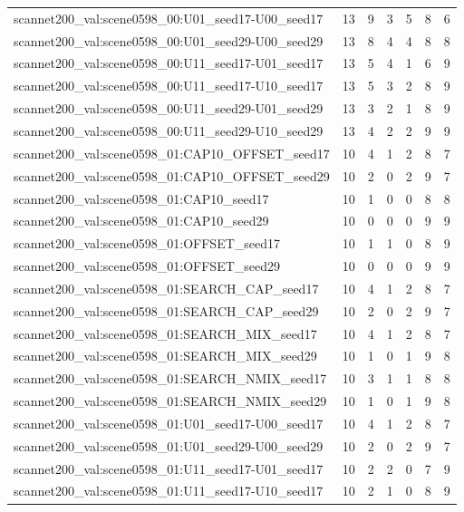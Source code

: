 \begin{table}[t]
\begin{tabular}{lrrrrrr}
scannet200\_val:scene0598\_00:U01\_seed17-U00\_seed17 & 13 & 9 & 3 & 5 & 8 & 6 \\
scannet200\_val:scene0598\_00:U01\_seed29-U00\_seed29 & 13 & 8 & 4 & 4 & 8 & 8 \\
scannet200\_val:scene0598\_00:U11\_seed17-U01\_seed17 & 13 & 5 & 4 & 1 & 6 & 9 \\
scannet200\_val:scene0598\_00:U11\_seed17-U10\_seed17 & 13 & 5 & 3 & 2 & 8 & 9 \\
scannet200\_val:scene0598\_00:U11\_seed29-U01\_seed29 & 13 & 3 & 2 & 1 & 8 & 9 \\
scannet200\_val:scene0598\_00:U11\_seed29-U10\_seed29 & 13 & 4 & 2 & 2 & 9 & 9 \\
scannet200\_val:scene0598\_01:CAP10\_OFFSET\_seed17 & 10 & 4 & 1 & 2 & 8 & 7 \\
scannet200\_val:scene0598\_01:CAP10\_OFFSET\_seed29 & 10 & 2 & 0 & 2 & 9 & 7 \\
scannet200\_val:scene0598\_01:CAP10\_seed17 & 10 & 1 & 0 & 0 & 8 & 8 \\
scannet200\_val:scene0598\_01:CAP10\_seed29 & 10 & 0 & 0 & 0 & 9 & 9 \\
scannet200\_val:scene0598\_01:OFFSET\_seed17 & 10 & 1 & 1 & 0 & 8 & 9 \\
scannet200\_val:scene0598\_01:OFFSET\_seed29 & 10 & 0 & 0 & 0 & 9 & 9 \\
scannet200\_val:scene0598\_01:SEARCH\_CAP\_seed17 & 10 & 4 & 1 & 2 & 8 & 7 \\
scannet200\_val:scene0598\_01:SEARCH\_CAP\_seed29 & 10 & 2 & 0 & 2 & 9 & 7 \\
scannet200\_val:scene0598\_01:SEARCH\_MIX\_seed17 & 10 & 4 & 1 & 2 & 8 & 7 \\
scannet200\_val:scene0598\_01:SEARCH\_MIX\_seed29 & 10 & 1 & 0 & 1 & 9 & 8 \\
scannet200\_val:scene0598\_01:SEARCH\_NMIX\_seed17 & 10 & 3 & 1 & 1 & 8 & 8 \\
scannet200\_val:scene0598\_01:SEARCH\_NMIX\_seed29 & 10 & 1 & 0 & 1 & 9 & 8 \\
scannet200\_val:scene0598\_01:U01\_seed17-U00\_seed17 & 10 & 4 & 1 & 2 & 8 & 7 \\
scannet200\_val:scene0598\_01:U01\_seed29-U00\_seed29 & 10 & 2 & 0 & 2 & 9 & 7 \\
scannet200\_val:scene0598\_01:U11\_seed17-U01\_seed17 & 10 & 2 & 2 & 0 & 7 & 9 \\
scannet200\_val:scene0598\_01:U11\_seed17-U10\_seed17 & 10 & 2 & 1 & 0 & 8 & 9 \\

\end{tabular}
\end{table}
